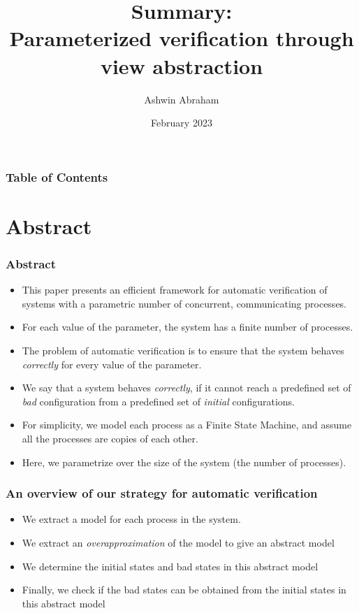 \documentclass{beamer}
\title[] 
{Summary:\\Parameterized verification through view abstraction}
\author[Ashwin Abraham] 
{Ashwin Abraham}
\institute[IIT-B] 
{
    IIT Bombay
}
\date[2023]
{February 2023}
\begin{document}
    \frame{\titlepage}

    \begin{frame}
        \frametitle{Table of Contents}
        \tableofcontents    
    \end{frame}

    \section{Abstract}
    {
        \begin{frame}
            \frametitle{Abstract}
            \begin{itemize}
                \item This paper presents an efficient framework for automatic verification of systems with a parametric number of concurrent, communicating processes. 
                \item For each value of the parameter, the system has a finite number of processes.
                
                \item The problem of automatic verification is to ensure that the system behaves \textit{correctly} for every value of the parameter.
                \item We say that a system behaves \textit{correctly}, if it cannot reach a predefined set of \textit{bad} configuration from a predefined set of \textit{initial} configurations. 
                
                \item For simplicity, we model each process as a Finite State Machine, and assume all the processes are copies of each other.
                \item Here, we parametrize over the size of the system (the number of processes).
            \end{itemize}
        \end{frame}

        \begin{frame}
            \frametitle{An overview of our strategy for automatic verification}
            \begin{itemize}
                \item We extract a model for each process in the system.
                \item We extract an \textit{overapproximation} of the model to give an abstract model
                \item We determine the initial states and bad states in this abstract model
                \item Finally, we check if the bad states can be obtained from the initial states in this abstract model
            \end{itemize}
        \end{frame}
    }
\end{document}
